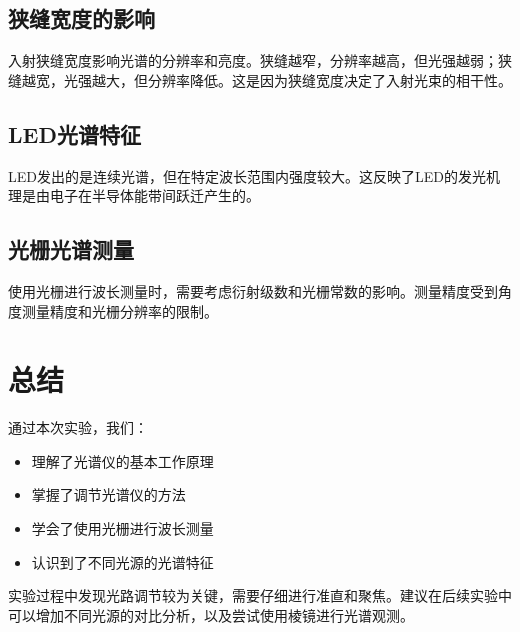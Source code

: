 \documentclass{ctexart}
\begin{document}
\subsection{狭缝宽度的影响}
入射狭缝宽度影响光谱的分辨率和亮度。狭缝越窄，分辨率越高，但光强越弱；狭缝越宽，光强越大，但分辨率降低。这是因为狭缝宽度决定了入射光束的相干性。

\subsection{LED光谱特征}
LED发出的是连续光谱，但在特定波长范围内强度较大。这反映了LED的发光机理是由电子在半导体能带间跃迁产生的。

\subsection{光栅光谱测量}
使用光栅进行波长测量时，需要考虑衍射级数和光栅常数的影响。测量精度受到角度测量精度和光栅分辨率的限制。

\section{总结}

通过本次实验，我们：
\begin{itemize}
    \item 理解了光谱仪的基本工作原理
    \item 掌握了调节光谱仪的方法
    \item 学会了使用光栅进行波长测量
    \item 认识到了不同光源的光谱特征
\end{itemize}

实验过程中发现光路调节较为关键，需要仔细进行准直和聚焦。建议在后续实验中可以增加不同光源的对比分析，以及尝试使用棱镜进行光谱观测。
\end{document}

